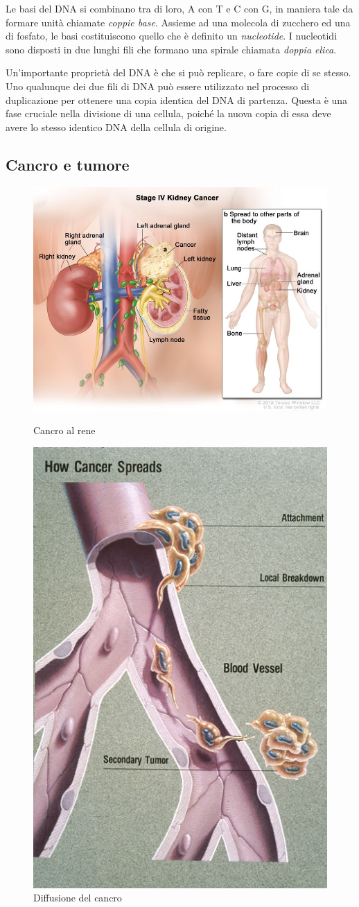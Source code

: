 Le basi del DNA si combinano tra di loro, A con T e C con G, in maniera tale da formare unità chiamate \textit{coppie base}. Assieme ad una molecola di zucchero ed una di fosfato, le basi costituiscono quello che è definito un \textit{nucleotide}. I nucleotidi sono disposti in due lunghi fili che formano una spirale chiamata \textit{doppia elica}.

Un'importante proprietà del DNA è che si può replicare, o fare copie di se stesso. Uno qualunque dei due fili di DNA \cite{WhatisDN79:online} può essere utilizzato nel processo di duplicazione per ottenere una copia identica del DNA di partenza. Questa è una fase cruciale nella divisione di una cellula, poiché la nuova copia di essa deve avere lo stesso identico DNA della cellula di origine.

\subsection{Cancro e tumore}

\begin{figure}[h]
    \begin{minipage}{.5 \textwidth}
        \centering
        \includegraphics[width=0.75 \textwidth]{Images/1_tumor.jpg}
        \caption{\small Cancro al rene}
        \label{fig:kidney-cancer}
    \end{minipage}%
    \begin{minipage}{.5 \textwidth}
        \centering
        \includegraphics[width=0.35 \textwidth]{./Images/1_metastasi_spread.jpg}
        \caption{\small Diffusione del cancro}
        \label{fig:metastasi}
    \end{minipage}
\end{figure}

